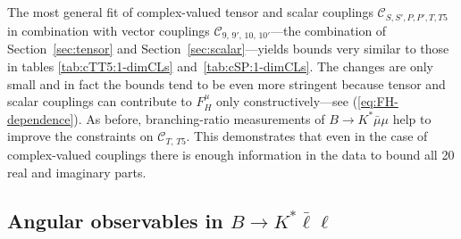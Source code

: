 \documentclass[twocolumn,epjc3]{svjour3}
\numberwithin{equation}{section}
\def \refeq#1{(\ref{#1})}
\def \refsec#1{Section~\ref{#1}}
\newcommand{\fred}[1]{{\color{green}{#1}}}
\newcommand{\wilson}[2][{}]{\mathcal{C}_{#2}^{\mathrm{#1}}}
\renewcommand{\[}{\big[}
\renewcommand{\]}{\big]}
\renewcommand{\(}{\big(}
\renewcommand{\)}{\big)}
\begin{document}
The most general fit of complex-valued tensor and scalar couplings
$\wilson{S,S',P,P',T,T5}$ in combination with vector couplings
$\wilson{9,\,9',\,10,\, 10'}$---the combination of \refsec{sec:tensor}
and \refsec{sec:scalar}---yields bounds very similar to those in
tables \ref{tab:cTT5:1-dimCLs} and~\ref{tab:cSP:1-dimCLs}. The changes
are only small and in fact the bounds tend to be even more stringent
\fred{by $\sim (10 - 20) \%$} because tensor and scalar couplings can
contribute to $F_H^{\mu}$ only constructively---see
\refeq{eq:FH-dependence}.  As before, branching-ratio measurements of
$B\to K^{*}\bar\mu\mu$ help to improve the constraints on
$\wilson{T,\, T5}$. This demonstrates that even in the case of
complex-valued couplings there is enough information in the data to
bound all 20 real and imaginary parts.

%
%
\subsection{Angular observables in $B\to K^* \bar\ell\ell$}
\end{document}
